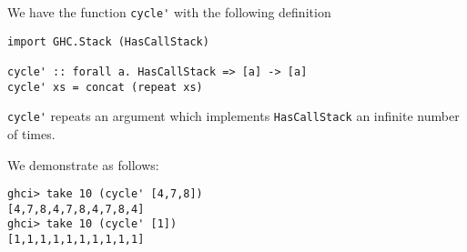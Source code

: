 
We have the function \verb|cycle'| with the following 
definition 
\begin{verbatim}
import GHC.Stack (HasCallStack)

cycle' :: forall a. HasCallStack => [a] -> [a]
cycle' xs = concat (repeat xs)
\end{verbatim}
\verb|cycle'| repeats an argument which implements \verb|HasCallStack| an
infinite number of times.\par
\qquad We demonstrate as follows:
\begin{verbatim}
ghci> take 10 (cycle' [4,7,8])
[4,7,8,4,7,8,4,7,8,4]
ghci> take 10 (cycle' [1])
[1,1,1,1,1,1,1,1,1,1]
\end{verbatim}
